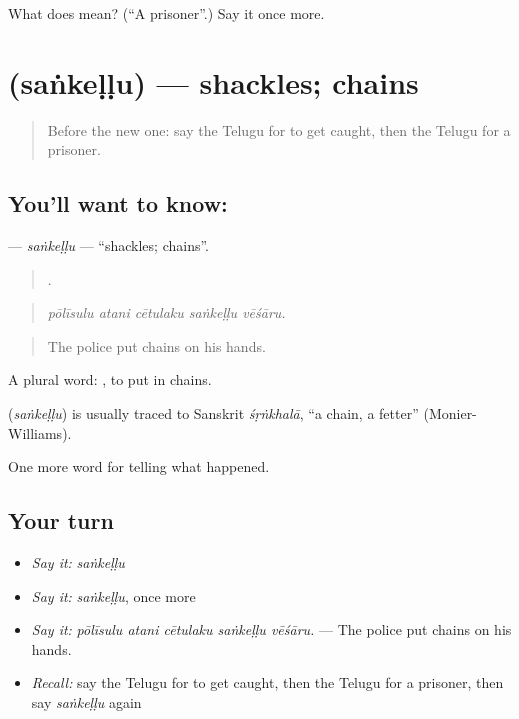 \begin{tcolorbox}[breakable,colback=teal!4,colframe=teal!35!black,title={Before you move on}]
What does  mean? (\textquotedblleft{}A prisoner\textquotedblright{}.) Say it once more.
\end{tcolorbox}
\section[\texorpdfstring{\te{సంకెళ్ళు} (saṅkeḷḷu)}{సంకెళ్ళు (saṅkeḷḷu)}]{ (saṅkeḷḷu) — shackles; chains}

\label{lesson:TE-C337-sankellu}



\begin{quote}
Before the new one: say the Telugu for to get caught, then the Telugu for a prisoner.
\end{quote}

\subsection*{You'll want to know: }
\textbf{} — \emph{saṅkeḷḷu} — \textquotedblleft{}shackles; chains\textquotedblright{}.

\begin{quote}
    .
\end{quote}

\begin{quote}
\emph{pōlīsulu atani cētulaku saṅkeḷḷu vēśāru.}
\end{quote}

\begin{quote}
The police put chains on his hands.
\end{quote}

A plural word:  , to put in chains.

\begin{cousinweb}
\textbf{} (\emph{saṅkeḷḷu}) is usually traced to Sanskrit \emph{śṛṅkhalā}, \textquotedblleft{}a chain, a fetter\textquotedblright{} (Monier-Williams).
\end{cousinweb}

\begin{grammarlens}[title={What you've built}]
One more word for telling what happened.
\end{grammarlens}

\subsection*{Your turn}
\begin{itemize}
\raggedright
  \item \emph{Say it:} \emph{saṅkeḷḷu}
  \item \emph{Say it:} \emph{saṅkeḷḷu}, once more
  \item \emph{Say it:} \emph{pōlīsulu atani cētulaku saṅkeḷḷu vēśāru.} — The police put chains on his hands.
  \item \emph{Recall:} say the Telugu for to get caught, then the Telugu for a prisoner, then say \emph{saṅkeḷḷu} again
\end{itemize}

